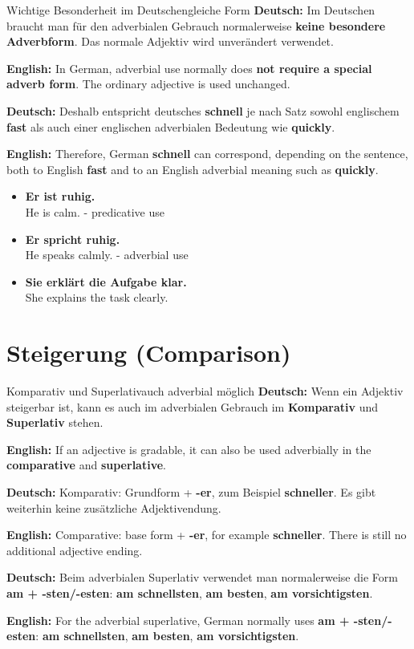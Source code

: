 \documentclass[a4paper,11pt]{article}
\newcommand{\GermanText}[1]{\textbf{Deutsch: }#1\par}
\newcommand{\EnglishText}[1]{{\small\color{SoftGray}\textbf{English: }#1\par}}
\newcommand{\ExampleItem}[2]{\item \textbf{#1}\\{\small\color{SoftGray}#2}}
\begin{document}
        \begin{grammarentry}{Wichtige Besonderheit im Deutschen}{gleiche Form}
            \GermanText{Im Deutschen braucht man für den adverbialen Gebrauch normalerweise \textbf{keine besondere Adverbform}. Das normale Adjektiv wird unverändert verwendet.}
            \EnglishText{In German, adverbial use normally does \textbf{not require a special adverb form}. The ordinary adjective is used unchanged.}

            \GermanText{Deshalb entspricht deutsches \textbf{schnell} je nach Satz sowohl englischem \textbf{fast} als auch einer englischen adverbialen Bedeutung wie \textbf{quickly}.}
            \EnglishText{Therefore, German \textbf{schnell} can correspond, depending on the sentence, both to English \textbf{fast} and to an English adverbial meaning such as \textbf{quickly}.}
        \end{grammarentry}

        \begin{exbox}
            \begin{itemize}
                \ExampleItem{Er ist ruhig.}{He is calm. - predicative use}
                \ExampleItem{Er spricht ruhig.}{He speaks calmly. - adverbial use}
                \ExampleItem{Sie erklärt die Aufgabe klar.}{She explains the task clearly.}
            \end{itemize}
        \end{exbox}

    \section{Steigerung \textnormal{(Comparison)}}

        \begin{grammarentry}{Komparativ und Superlativ}{auch adverbial möglich}
            \GermanText{Wenn ein Adjektiv steigerbar ist, kann es auch im adverbialen Gebrauch im \textbf{Komparativ} und \textbf{Superlativ} stehen.}
            \EnglishText{If an adjective is gradable, it can also be used adverbially in the \textbf{comparative} and \textbf{superlative}.}

            \GermanText{Komparativ: Grundform + \textbf{-er}, zum Beispiel \textbf{schneller}. Es gibt weiterhin keine zusätzliche Adjektivendung.}
            \EnglishText{Comparative: base form + \textbf{-er}, for example \textbf{schneller}. There is still no additional adjective ending.}

            \GermanText{Beim adverbialen Superlativ verwendet man normalerweise die Form \textbf{am + -sten/-esten}: \textbf{am schnellsten}, \textbf{am besten}, \textbf{am vorsichtigsten}.}
            \EnglishText{For the adverbial superlative, German normally uses \textbf{am + -sten/-esten}: \textbf{am schnellsten}, \textbf{am besten}, \textbf{am vorsichtigsten}.}
        \end{grammarentry}
\end{document}
